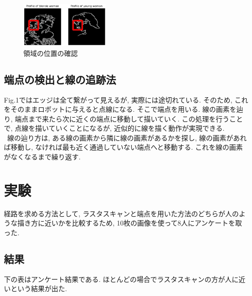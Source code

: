 \documentclass[10pt]{jarticle}
\begin{document}
    \begin{center}
        \begin{figure}[h]
            \includegraphics[width=0.40\textwidth]{img/003.png}
            \caption{領域の位置の確認}
            \label{the position of a region}
        \end{figure}
    \end{center}
	

	\subsection{端点の検出と線の追跡法}
	Fig.1ではエッジは全て繋がって見えるが, 実際には途切れている. そのため, これをそのままロボットに与えると点線になる.
	そこで端点を用いる.
	線の画素を辿り, 端点まで来たら次に近くの端点に移動して描いていく.
	この処理を行うことで, 点線を描いていくことになるが, 近似的に線を描く動作が実現できる.
  \\\  
	線の辿り方は, ある線の画素から隣に線の画素があるかを探し, 線の画素があれば移動し, なければ最も近く通過していない端点へと移動する.
	これを線の画素がなくなるまで繰り返す.
	
	\section{実験}
	経路を求める方法として, ラスタスキャンと端点を用いた方法のどちらが人のような描き方に近いかを比較するため, 10枚の画像を使って8人にアンケートを取った.

	\subsection{結果}
	下の表はアンケート結果である. ほとんどの場合でラスタスキャンの方が人に近いという結果が出た. 
\end{document}
